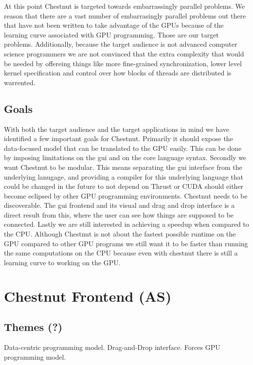 \documentclass{article}
\renewcommand{\|}{\origbar} %
\begin{document}
At this point Chestnut is targeted towards embarrassingly parallel problems. We reason that there are a vast number of embarrasingly parallel problems out there that have not been written to take advantage of the GPUs because of the learning curve associated with GPU programming. Those are our target problems. Additionally, because the target audience is not advanced computer science programmers we are not convinced that the extra complexity that would be needed by offereing things like more fine-grained synchronization, lower level kernel specification and control over how blocks of threads are distributed is warrented.

\subsection{Goals}

With both the target audience and the target applications in mind we have identified a few important goals for Chestnut. Primarily it should expose the data-focused model that can be translated to the GPU easily. This can be done by imposing limitations on the gui and on the core language syntax. Secondly we want Chestnut to be modular. This means separating the gui interface from the underlying lanugage, and providing a compiler for this underlying language that could be changed in the future to not depend on Thrust or CUDA should either become eclipsed by other GPU programming environments. Chestnut needs to be discoverable. The gui frontend and its visual and drag and drop interface is a direct result from this, where the user can see how things are supposed to be connected. Lastly we are still interested in achieving a speedup when compared to the CPU. Although Chestnut is not about the fastest possible runtime on the GPU compared to other GPU programs we still want it to be faster than running the same computations on the CPU because even with chestnut there is still a learning curve to working on the GPU.

\section{Chestnut Frontend (AS)}

\subsection{Themes (?)}

Data-centric programming model. Drag-and-Drop interface. Forces GPU programming model.
\end{document}
